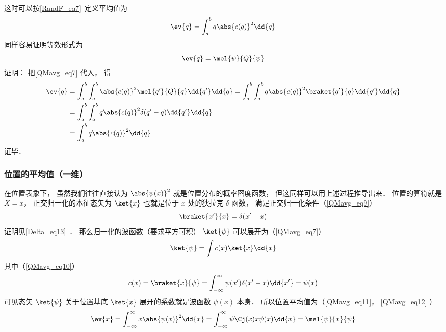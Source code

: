 这时可以按\autoref{RandF_eq7}~定义平均值为
\begin{equation}\label{QMavg_eq11}
\ev{q} = \int_a^b q \abs{c(q)}^2 \dd{q}
\end{equation}
同样容易证明等效形式为
\begin{equation}\label{QMavg_eq12}
\ev{q} = \mel{\psi}{Q}{\psi}
\end{equation}
证明： 把\autoref{QMavg_eq7} 代入， 得
\begin{equation}
\begin{aligned}
\ev{q} &= \int_a^b\int_a^b \abs{c(q)}^2\mel{q'}{Q}{q} \dd{q'}\dd{q} = \int_a^b\int_a^b q\abs{c(q)}^2\braket{q'}{q} \dd{q'}\dd{q}\\
&= \int_a^b\int_a^b q\abs{c(q)}^2\delta(q'-q) \dd{q'}\dd{q}\\
&= \int_a^b q\abs{c(q)}^2 \dd{q}
\end{aligned}
\end{equation}
证毕．

\subsubsection{位置的平均值（一维）}
在位置表象下， 虽然我们往往直接认为 $\abs{\psi(x)}^2$ 就是位置分布的概率密度函数， 但这同样可以用上述过程推导出来． 位置的算符就是 $X = x$， 正交归一化的本征态矢为 $\ket{x}$ 也就是位于 $x$ 处的狄拉克 $\delta$ 函数， 满足正交归一化条件（\autoref{QMavg_eq9}）
\begin{equation}
\braket{x'}{x} = \delta(x'-x)
\end{equation}
证明见\autoref{Delta_eq13}~． 那么归一化的波函数（要求平方可积） $\ket{\psi}$ 可以展开为（\autoref{QMavg_eq7}）
\begin{equation}
\ket{\psi} = \int c(x) \ket{x}\dd{x}
\end{equation}
其中（\autoref{QMavg_eq10}）
\begin{equation}
c(x) = \braket{x}{\psi} = \int_{-\infty}^\infty \psi(x')\delta(x'-x)\dd{x'} = \psi(x)
\end{equation}
可见态矢 $\ket{\psi}$ 关于位置基底 $\ket{x}$ 展开的系数就是波函数 $\psi(x)$ 本身． 所以位置平均值为（\autoref{QMavg_eq11}， \autoref{QMavg_eq12} ）
\begin{equation}
\ev{x} = \int_{-\infty}^\infty x \abs{\psi(x)}^2 \dd{x} = \int_{-\infty}^\infty \psi\Cj(x)x \psi(x) \dd{x} = \mel{\psi}{x}{\psi}
\end{equation}


